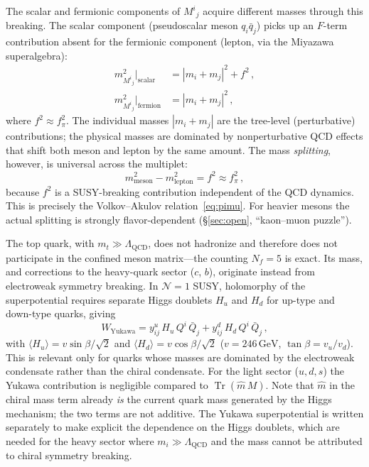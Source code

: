 \documentclass[12pt,a4paper]{article}
\newcommand{\GeV}{\,\text{GeV}}
\newcommand{\fpi}{f_\pi}
\begin{document}
The scalar and fermionic components of $M^i{}_j$ acquire different masses
through this breaking. The scalar component (pseudoscalar meson $q_i\bar q_j$)
picks up an $F$-term contribution absent for the fermionic component (lepton,
via the Miyazawa superalgebra):
%
\begin{align*}
  m^2_{M^i{}_j}\big|_{\text{scalar}}
  &= |m_i + m_j|^2 + f^2\,,\\[3pt]
  m^2_{M^i{}_j}\big|_{\text{fermion}}
  &= |m_i + m_j|^2\,,
\end{align*}
%
where $f^2\approx \fpi^2$. The individual masses $|m_i + m_j|$ are
the tree-level (perturbative) contributions; the physical masses are
dominated by nonperturbative QCD effects that shift both meson and
lepton by the same amount.  The mass \emph{splitting}, however,
is universal across the multiplet:
%
\begin{equation*}
  m^2_{\text{meson}} - m^2_{\text{lepton}} = f^2 \approx \fpi^2\,,
\end{equation*}
%
because $f^2$ is a SUSY-breaking contribution independent of the QCD
dynamics.  This is precisely the Volkov--Akulov
relation~\eqref{eq:pimu}.
For heavier mesons the actual splitting is strongly flavor-dependent
(\S\ref{sec:open}, ``kaon--muon puzzle'').

The top quark, with $m_t\gg\Lambda_{\text{QCD}}$, does not hadronize and
therefore does not participate in the confined meson matrix---the counting
$N_f=5$ is exact. Its mass, and corrections to the heavy-quark sector
($c$, $b$), originate instead from electroweak symmetry breaking.
In $\mathcal{N}=1$ SUSY, holomorphy of the superpotential requires
separate Higgs doublets $H_u$ and $H_d$ for up-type and down-type
quarks, giving
%
\begin{equation*}
  W_{\text{Yukawa}}
  = y^u_{ij}\, H_u\, Q^i\, \bar Q_j
  + y^d_{ij}\, H_d\, Q^i\, \bar Q_j\,,
\end{equation*}
%
with $\langle H_u\rangle = v\sin\beta/\sqrt{2}$ and
$\langle H_d\rangle = v\cos\beta/\sqrt{2}$
($v = 246\GeV$, $\tan\beta = v_u/v_d$).
This is relevant only for quarks whose masses are dominated by the
electroweak condensate rather than the chiral condensate. For the light sector
($u,d,s$) the Yukawa contribution is negligible compared to
$\operatorname{Tr}(\hat m\, M)$. Note that $\hat m$ in the chiral
mass term already \emph{is} the current quark mass generated by the
Higgs mechanism; the two terms are not additive.  The Yukawa
superpotential is written separately to make explicit the dependence
on the Higgs doublets, which are needed for the heavy sector where
$m_i \gg \Lambda_{\text{QCD}}$ and the mass cannot be attributed to
chiral symmetry breaking.
\end{document}
